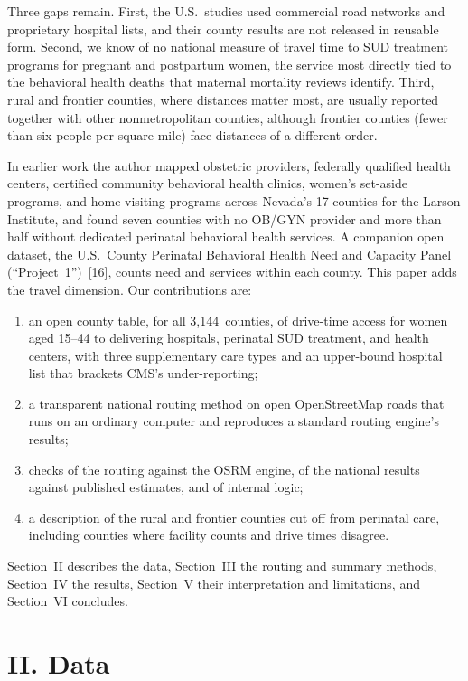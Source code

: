\documentclass{article}
\begin{document}
Three gaps remain. First, the U.S.\ studies used commercial road networks and proprietary hospital lists, and their county results are not released in reusable form. Second, we know of no national measure of travel time to SUD treatment programs for pregnant and postpartum women, the service most directly tied to the behavioral health deaths that maternal mortality reviews identify. Third, rural and frontier counties, where distances matter most, are usually reported together with other nonmetropolitan counties, although frontier counties (fewer than six people per square mile) face distances of a different order.

In earlier work the author mapped obstetric providers, federally qualified health centers, certified community behavioral health clinics, women's set-aside programs, and home visiting programs across Nevada's 17 counties for the Larson Institute, and found seven counties with no OB/GYN provider and more than half without dedicated perinatal behavioral health services. A companion open dataset, the U.S.\ County Perinatal Behavioral Health Need and Capacity Panel (``Project~1'')~[16], counts need and services within each county. This paper adds the travel dimension. Our contributions are:
\begin{enumerate}
\item an open county table, for all 3,144\ counties, of drive-time access for women aged 15--44 to delivering hospitals, perinatal SUD treatment, and health centers, with three supplementary care types and an upper-bound hospital list that brackets CMS's under-reporting;
\item a transparent national routing method on open OpenStreetMap roads that runs on an ordinary computer and reproduces a standard routing engine's results;
\item checks of the routing against the OSRM engine, of the national results against published estimates, and of internal logic;
\item a description of the rural and frontier counties cut off from perinatal care, including counties where facility counts and drive times disagree.
\end{enumerate}
Section~II describes the data, Section~III the routing and summary methods, Section~IV the results, Section~V their interpretation and limitations, and Section~VI concludes.

\section*{II. Data}
\end{document}
